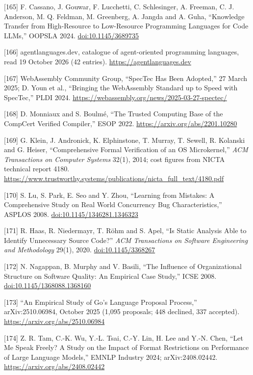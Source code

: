 \documentclass[10pt,letterpaper]{article}
\begin{document}
{[}165{]} F. Cassano, J. Gouwar, F. Lucchetti, C. Schlesinger, A.
Freeman, C. J. Anderson, M. Q. Feldman, M. Greenberg, A. Jangda and A.
Guha, ``Knowledge Transfer from High-Resource to Low-Resource
Programming Languages for Code LLMs,'' OOPSLA 2024.
\href{https://doi.org/10.1145/3689735}{doi:10.1145/3689735}

{[}166{]} agentlanguages.dev, catalogue of agent-oriented programming
languages, read 19 October 2026 (42 entries).
\url{https://agentlanguages.dev}

{[}167{]} WebAssembly Community Group, ``SpecTec Has Been Adopted,'' 27
March 2025; D. Youn et al., ``Bringing the WebAssembly Standard up to
Speed with SpecTec,'' PLDI 2024.
\url{https://webassembly.org/news/2025-03-27-spectec/}

{[}168{]} D. Monniaux and S. Boulmé, ``The Trusted Computing Base of the
CompCert Verified Compiler,'' ESOP 2022.
\url{https://arxiv.org/abs/2201.10280}

{[}169{]} G. Klein, J. Andronick, K. Elphinstone, T. Murray, T. Sewell,
R. Kolanski and G. Heiser, ``Comprehensive Formal Verification of an OS
Microkernel,'' \emph{ACM Transactions on Computer Systems} 32(1), 2014;
cost figures from NICTA technical report 4180.
\url{https://www.trustworthy.systems/publications/nicta_full_text/4180.pdf}

{[}170{]} S. Lu, S. Park, E. Seo and Y. Zhou, ``Learning from Mistakes:
A Comprehensive Study on Real World Concurrency Bug Characteristics,''
ASPLOS 2008.
\href{https://doi.org/10.1145/1346281.1346323}{doi:10.1145/1346281.1346323}

{[}171{]} R. Haas, R. Niedermayr, T. Röhm and S. Apel, ``Is Static
Analysis Able to Identify Unnecessary Source Code?'' \emph{ACM
Transactions on Software Engineering and Methodology} 29(1), 2020.
\href{https://doi.org/10.1145/3368267}{doi:10.1145/3368267}

{[}172{]} N. Nagappan, B. Murphy and V. Basili, ``The Influence of
Organizational Structure on Software Quality: An Empirical Case Study,''
ICSE 2008.
\href{https://doi.org/10.1145/1368088.1368160}{doi:10.1145/1368088.1368160}

{[}173{]} ``An Empirical Study of Go's Language Proposal Process,''
arXiv:2510.06984, October 2025 (1,095 proposals; 448 declined, 337
accepted). \url{https://arxiv.org/abs/2510.06984}

{[}174{]} Z. R. Tam, C.-K. Wu, Y.-L. Tsai, C.-Y. Lin, H. Lee and Y.-N.
Chen, ``Let Me Speak Freely? A Study on the Impact of Format
Restrictions on Performance of Large Language Models,'' EMNLP Industry
2024; arXiv:2408.02442. \url{https://arxiv.org/abs/2408.02442}
\end{document}

